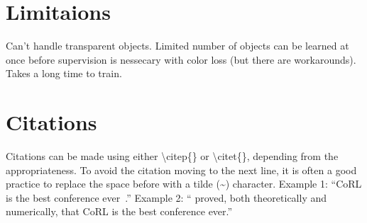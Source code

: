 \documentclass{article}
\begin{document}

\section{Limitaions}
\label{sec:Limitations} 

Can't handle transparent objects. 
Limited number of objects can be learned at once before supervision is nessecary with color loss (but there are workarounds).
Takes a long time to train.



\section{Citations} 
\label{sec:citations} 

Citations can be made using either \textbackslash citep\{\} or \textbackslash citet\{\}, depending from the appropriateness. To avoid the citation moving to the next line, it is often a good practice to replace the space before with a tilde (\~{}) character.
Example 1: ``CoRL is the best conference ever~\citep{Gauss1857}.''
Example 2: ``\citet{Gauss1857} proved, both theoretically and numerically, that CoRL is the best conference ever.''


\clearpage
\acknowledgments{}


\end{document}
